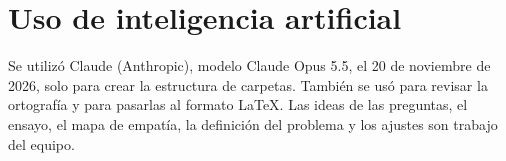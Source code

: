\documentclass[conference,a4paper]{IEEEtran}
\begin{document}
\section*{Uso de inteligencia artificial}
Se utilizó Claude (Anthropic), modelo Claude Opus 5.5, el 20 de noviembre de 2026,
solo para crear la estructura de carpetas. También se usó para revisar la ortografía y para pasarlas
al formato \LaTeX{}. Las ideas de las preguntas, el ensayo, el mapa de empatía,
la definición del problema y los ajustes son trabajo del equipo.

\printbibliography
\end{document}
